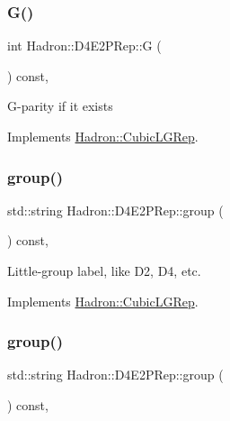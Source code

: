 \subsubsection{\texorpdfstring{G()}{G()}\hspace{0.1cm}{\footnotesize\ttfamily [2/2]}}
{\footnotesize\ttfamily int Hadron\+::\+D4\+E2\+P\+Rep\+::G (\begin{DoxyParamCaption}{ }\end{DoxyParamCaption}) const\hspace{0.3cm}{\ttfamily [inline]}, {\ttfamily [virtual]}}

G-\/parity if it exists 

Implements \mbox{\hyperlink{structHadron_1_1CubicLGRep_ace26f7b2d55e3a668a14cb9026da5231}{Hadron\+::\+Cubic\+L\+G\+Rep}}.

\mbox{\label{structHadron_1_1D4E2PRep_aed8be064eb6b01ca2b29d54130ac7023}} 
\subsubsection{\texorpdfstring{group()}{group()}\hspace{0.1cm}{\footnotesize\ttfamily [1/2]}}
{\footnotesize\ttfamily std\+::string Hadron\+::\+D4\+E2\+P\+Rep\+::group (\begin{DoxyParamCaption}{ }\end{DoxyParamCaption}) const\hspace{0.3cm}{\ttfamily [inline]}, {\ttfamily [virtual]}}

Little-\/group label, like D2, D4, etc. 

Implements \mbox{\hyperlink{structHadron_1_1CubicLGRep_a9bdb14b519a611d21379ed96a3a9eb41}{Hadron\+::\+Cubic\+L\+G\+Rep}}.

\mbox{\label{structHadron_1_1D4E2PRep_aed8be064eb6b01ca2b29d54130ac7023}} 
\subsubsection{\texorpdfstring{group()}{group()}\hspace{0.1cm}{\footnotesize\ttfamily [2/2]}}
{\footnotesize\ttfamily std\+::string Hadron\+::\+D4\+E2\+P\+Rep\+::group (\begin{DoxyParamCaption}{ }\end{DoxyParamCaption}) const\hspace{0.3cm}{\ttfamily [inline]}, {\ttfamily [virtual]}}

